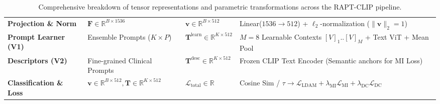 \documentclass[11pt,a4paper]{article}
\begin{document}
\begin{table}[h!]
\begin{tabular}{@{}llll@{}}
\textbf{Projection \& Norm} & $\mathbf{F} \in \mathbb{R}^{B \times 1536}$ & $\mathbf{v} \in \mathbb{R}^{B \times 512}$ & Linear($1536 \!\rightarrow\! 512$) + $\ell_2$-normalization ($\|\mathbf{v}\|_2 = 1$) \\
\textbf{Prompt Learner (V1)} & Ensemble Prompts ($K \!\times\! P$) & $\mathbf{T}^{\text{learn}} \in \mathbb{R}^{K \times 512}$ & $M=8$ Learnable Contexts $[V]_1..[V]_M$ + Text ViT + Mean Pool \\
\textbf{Descriptors (V2)} & Fine-grained Clinical Prompts & $\mathbf{T}^{\text{desc}} \in \mathbb{R}^{K \times 512}$ & Frozen CLIP Text Encoder (Semantic anchors for MI Loss) \\
\textbf{Classification \& Loss} & $\mathbf{v} \in \mathbb{R}^{B \times 512}, \mathbf{T} \in \mathbb{R}^{K \times 512}$ & $\mathcal{L}_{\text{total}} \in \mathbb{R}$ & Cosine Sim / $\tau \rightarrow \mathcal{L}_{\text{LDAM}} + \lambda_{\text{MI}}\mathcal{L}_{\text{MI}} + \lambda_{\text{DC}}\mathcal{L}_{\text{DC}}$ \\
\bottomrule
\end{tabular}
\caption{Comprehensive breakdown of tensor representations and parametric transformations across the RAPT-CLIP pipeline.}
\end{table}

\vspace{0.5em}
\end{document}
